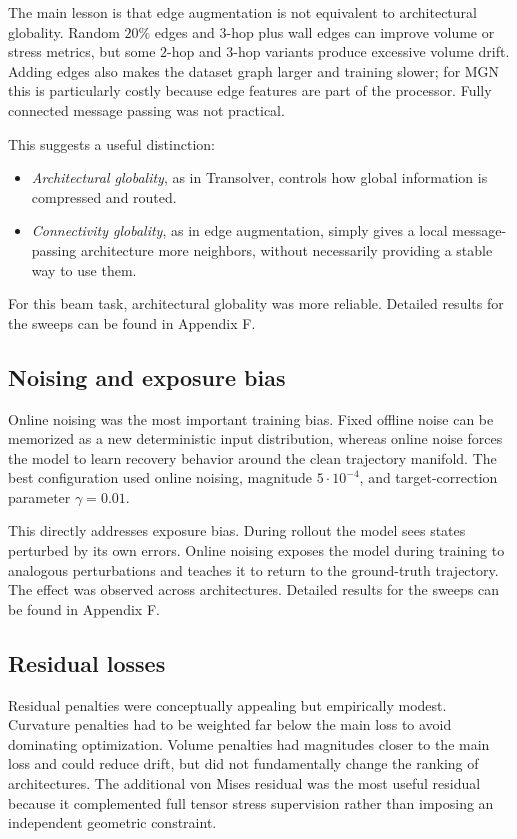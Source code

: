 \documentclass[11pt,a4paper,reqno]{amsart}
\theoremstyle{definition}
\theoremstyle{remark}
\numberwithin{equation}{section}
\begin{document}
The main lesson is that edge augmentation is not equivalent to architectural globality. Random $20\%$ edges and $3$-hop plus wall edges can improve volume or stress metrics, but some $2$-hop and $3$-hop variants produce excessive volume drift. Adding edges also makes the dataset graph larger and training slower; for MGN this is particularly costly because edge features are part of the processor. Fully connected message passing was not practical.

This suggests a useful distinction:
\begin{itemize}[leftmargin=1.3em]
    \item \emph{Architectural globality}, as in Transolver, controls how global information is compressed and routed.
    \item \emph{Connectivity globality}, as in edge augmentation, simply gives a local message-passing architecture more neighbors, without necessarily providing a stable way to use them.
\end{itemize}
For this beam task, architectural globality was more reliable. Detailed results for the sweeps can be found in Appendix F. 

\subsection{Noising and exposure bias}

Online noising was the most important training bias. Fixed offline noise can be memorized as a new deterministic input distribution, whereas online noise forces the model to learn recovery behavior around the clean trajectory manifold. The best configuration used online noising, magnitude $5\cdot 10^{-4}$, and target-correction parameter $\gamma=0.01$.

This directly addresses exposure bias. During rollout the model sees states perturbed by its own errors. Online noising exposes the model during training to analogous perturbations and teaches it to return to the ground-truth trajectory. The effect was observed across architectures. Detailed results for the sweeps can be found in Appendix F.

\subsection{Residual losses}

Residual penalties were conceptually appealing but empirically modest. Curvature penalties had to be weighted far below the main loss to avoid dominating optimization. Volume penalties had magnitudes closer to the main loss and could reduce drift, but did not fundamentally change the ranking of architectures. The additional von Mises residual was the most useful residual because it complemented full tensor stress supervision rather than imposing an independent geometric constraint.
\end{document}
